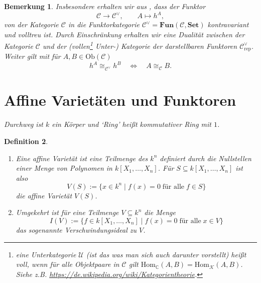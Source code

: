 \documentclass[a4paper, 11pt]{scrartcl}
\newcommand{\C}{\mathbb{C}}
\newcommand{\Hom}{\text{Hom}}
\newcommand{\Ob}{\text{Ob}}
\newcommand{\CC}{\mathcal{C}}
\theoremstyle{basicstyle}
\newtheorem{definition}{Definition}[section]
\newtheorem{bemerkung}[definition]{Bemerkung}
\begin{document}
    \begin{bemerkung}\label{bem:2}
        Insbesondere erhalten wir aus , dass der Funktor
        \[\mathcal{C} \longrightarrow \mathcal{C}^\vee, \qquad A \mapsto h^A,\]
        von der Kategorie \(\mathcal{C}\) in die Funktorkategorie \(\mathcal{C}^\vee = \textbf{Fun}(\mathcal{C}, \textbf{Set})\) kontravariant und volltreu ist. %
        Durch Einschränkung erhalten wir eine Dualität zwischen der Kategorie \(\CC\) und der (vollen\footnote[1]{eine Unterkategorie \(\mathcal{U}\) (ist das was man sich auch darunter vorstellt) heißt voll, wenn für alle Objektpaare in \(\CC\) gilt \(\Hom_{\C}(A, B) = \Hom_{\mathcal{K}}(A, B)\). Siehe z.B. \url{https://de.wikipedia.org/wiki/Kategorientheorie}.} Unter-) Kategorie der darstellbaren Funktoren \(\CC_{\text{rep}}^\vee\).
        Weiter gilt mit  für \(A, B \in \Ob(\CC)\)
        \[h^A \cong_{\CC^\vee} h^B \quad\iff\quad A \cong_\CC B.\]
    \end{bemerkung}

    \newpage

    \section{Affine Varietäten und Funktoren}
    
    {\itshape Durchweg ist \(k\) ein Körper und `Ring' heißt kommutativer Ring mit \(1\).}
    
    \begin{definition}
        \begin{enumerate}
            \item Eine \emph{affine Varietät} ist eine Teilmenge des \(k^n\) definiert durch die Nullstellen einer Menge von Polynomen in \(k[X_1, \ldots, X_n]\).
                Für \(S \subseteq k[X_1, \ldots, X_n]\) ist also 
                \[V(S) := \{x \in k^n \;\vert\; f(x) = 0 \; \text{für alle}\; f \in S\}\]
                die affine Varietät \(V(S)\).

            \item Umgekehrt ist für eine Teilmenge \(V \subseteq k^n\) die Menge
                \[I(V) := \{f \in k[X_1, \ldots, X_n] \;\vert\; f(x) = 0 \;\text{für alle}\; x \in V\}\]
                das sogenannte \emph{Verschwindungsideal} zu \(V\).
        \end{enumerate}
    \end{definition}
\end{document}
